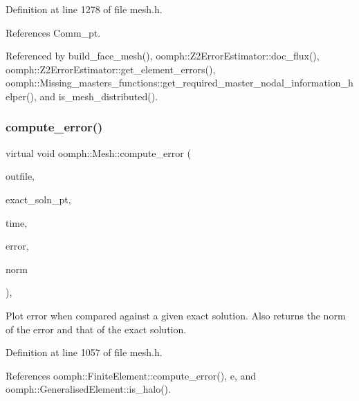 Definition at line 1278 of file mesh.\+h.



References Comm\+\_\+pt.



Referenced by build\+\_\+face\+\_\+mesh(), oomph\+::\+Z2\+Error\+Estimator\+::doc\+\_\+flux(), oomph\+::\+Z2\+Error\+Estimator\+::get\+\_\+element\+\_\+errors(), oomph\+::\+Missing\+\_\+masters\+\_\+functions\+::get\+\_\+required\+\_\+master\+\_\+nodal\+\_\+information\+\_\+helper(), and is\+\_\+mesh\+\_\+distributed().

\mbox{\label{classoomph_1_1Mesh_a7ccc8ea627c4aaeace90c78365b7ea30}} 
\subsubsection{\texorpdfstring{compute\+\_\+error()}{compute\_error()}\hspace{0.1cm}{\footnotesize\ttfamily [1/4]}}
{\footnotesize\ttfamily virtual void oomph\+::\+Mesh\+::compute\+\_\+error (\begin{DoxyParamCaption}\item[{std\+::ostream \&}]{outfile,  }\item[{\hyperlink{classoomph_1_1FiniteElement_ad4ecf2b61b158a4b4d351a60d23c633e}{Finite\+Element\+::\+Unsteady\+Exact\+Solution\+Fct\+Pt}}]{exact\+\_\+soln\+\_\+pt,  }\item[{const double \&}]{time,  }\item[{double \&}]{error,  }\item[{double \&}]{norm }\end{DoxyParamCaption})\hspace{0.3cm}{\ttfamily [inline]}, {\ttfamily [virtual]}}



Plot error when compared against a given exact solution. Also returns the norm of the error and that of the exact solution. 



Definition at line 1057 of file mesh.\+h.



References oomph\+::\+Finite\+Element\+::compute\+\_\+error(), e, and oomph\+::\+Generalised\+Element\+::is\+\_\+halo().

\mbox{\label{classoomph_1_1Mesh_a9488e849a82ef1fc4971013e3661a1ce}} 

